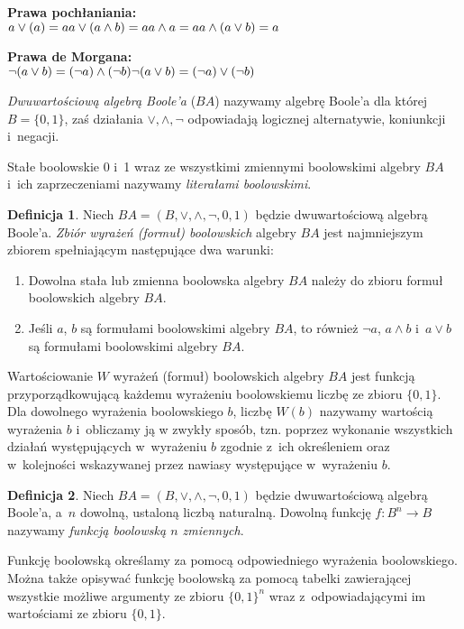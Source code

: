 \documentclass[a4paper,11pt,twoside]{article}
\theoremstyle{definition}
\newtheorem{df}{Definicja}
\begin{document}
\noindent
{\bf Prawa pochłaniania:} \\
$
a \vee (a) = a \\
a \vee (a \wedge b) = a\\
a \wedge a = a\\
a \wedge  (a \vee b) = a
$


\noindent
{\bf Prawa de Morgana:} \\
$
\neg (a \vee b) = (\neg a) \wedge (\neg b) \\
\neg (a \vee b) = (\neg a) \vee (\neg b)\\
$


{\em Dwuwartościową algebrą Boole'a} ($\mathit{BA}$) nazywamy algebrę Boole'a dla której $B=\{0,1\}$, zaś działania $\vee,\wedge,\neg$ odpowiadają logicznej alternatywie, koniunkcji i~negacji.

Stałe boolowskie 0 i~1 wraz ze wszystkimi zmiennymi boolowskimi algebry $\mathit{BA}$ i~ich zaprzeczeniami nazywamy {\em literałami boolowskimi}. 
\begin{df}
Niech $\mathit{BA} = (B,\vee,\wedge,\neg,0,1)$ będzie dwuwartościową algebrą Boole'a. {\em Zbiór wyrażeń (formuł) boolowskich}  algebry $\mathit{BA}$ jest najmniejszym zbiorem spełniającym następujące dwa warunki:
\begin{enumerate}

\item Dowolna stała lub zmienna boolowska algebry $\mathit{BA}$ należy do zbioru formuł boolowskich algebry $\mathit{BA}$.

\item Jeśli $a$, $b$ są formułami boolowskimi algebry $\mathit{BA}$, to również $\neg a$, $a \wedge b$ i~$a \vee b$ są formułami boolowskimi algebry $\mathit{BA}$.
\end{enumerate}
\end{df}

Wartościowanie $W$ wyrażeń (formuł) boolowskich algebry $\mathit{BA}$ jest funkcją przyporządkowującą każdemu wyrażeniu boolowskiemu liczbę ze zbioru $\{0,1\}$. Dla dowolnego wyrażenia boolowskiego $b$, liczbę $W(b)$ nazywamy wartością wyrażenia $b$ i~obliczamy ją w zwykły sposób, tzn. poprzez wykonanie wszystkich działań występujących w~wyrażeniu $b$ zgodnie z~ich określeniem oraz w~kolejności wskazywanej przez nawiasy występujące w~wyrażeniu $b$.\\

\begin{df}
Niech $\mathit{BA} = (B,\vee,\wedge,\neg,0,1)$ będzie dwuwartościową algebrą Boole'a, a~$n$ dowolną, ustaloną liczbą naturalną. Dowolną funkcję $f\colon B^n \to B$ nazywamy {\em funkcją boolowską $n$ zmiennych}.
\end{df}
Funkcję boolowską określamy za pomocą odpowiedniego wyrażenia boolowskiego. Można także opisywać funkcję boolowską za pomocą tabelki zawierającej wszystkie możliwe argumenty ze zbioru $\{0,1\}^n$ wraz z~odpowiadającymi im wartościami ze zbioru $\{0,1\}$.
\end{document}
